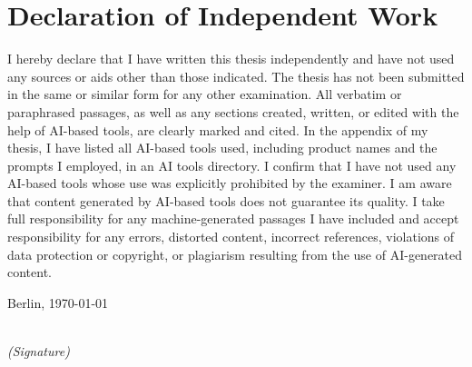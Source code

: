 \newpage
\thispagestyle{empty}
\chapter*{Declaration of Independent Work}

\noindent I hereby declare that I have written this thesis independently and have not used any sources or aids other than those indicated. The thesis has not been submitted in the same or similar form for any other examination. All verbatim or paraphrased passages, as well as any sections created, written, or edited with the help of AI-based tools, are clearly marked and cited. In the appendix of my thesis, I have listed all AI-based tools used, including product names and the prompts I employed, in an AI tools directory. I confirm that I have not used any AI-based tools whose use was explicitly prohibited by the examiner. I am aware that content generated by AI-based tools does not guarantee its quality. I take full responsibility for any machine-generated passages I have included and accept responsibility for any errors, distorted content, incorrect references, violations of data protection or copyright, or plagiarism resulting from the use of AI-generated content.


\vspace{2cm}

\noindent
Berlin, \today

\vspace{3cm}

\hspace*{7cm}%
\dotfill\\
\hspace*{8.5cm}%
\textit{(Signature)}
